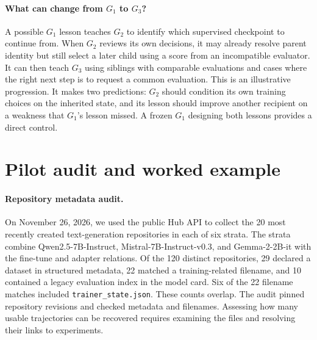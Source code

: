 \documentclass{article}
\newcommand{\field}[1]{\texttt{#1}}
\begin{document}
\paragraph{What can change from \(G_1\) to \(G_3\)?}
A possible \(G_1\) lesson teaches \(G_2\) to identify which supervised checkpoint to continue from. When \(G_2\) reviews its own decisions, it may already resolve parent identity but still select a later child using a score from an incompatible evaluator. It can then teach \(G_3\) using siblings with comparable evaluations and cases where the right next step is to request a common evaluation. This is an illustrative progression. It makes two predictions: \(G_2\) should condition its own training choices on the inherited state, and its lesson should improve another recipient on a weakness that \(G_1\)'s lesson missed. A frozen \(G_1\) designing both lessons provides a direct control.

\section{Pilot audit and worked example}
\label{sec:pilot}

\paragraph{Repository metadata audit.}
On November 26, 2026, we used the public Hub API to collect the 20 most recently created text-generation repositories in each of six strata. The strata combine Qwen2.5-7B-Instruct, Mistral-7B-Instruct-v0.3, and Gemma-2-2B-it with the fine-tune and adapter relations. Of the 120 distinct repositories, 29 declared a dataset in structured metadata, 22 matched a training-related filename, and 10 contained a legacy evaluation index in the model card. Six of the 22 filename matches included \field{trainer\_state.json}. These counts overlap. The audit pinned repository revisions and checked metadata and filenames. Assessing how many usable trajectories can be recovered requires examining the files and resolving their links to experiments.
\end{document}
